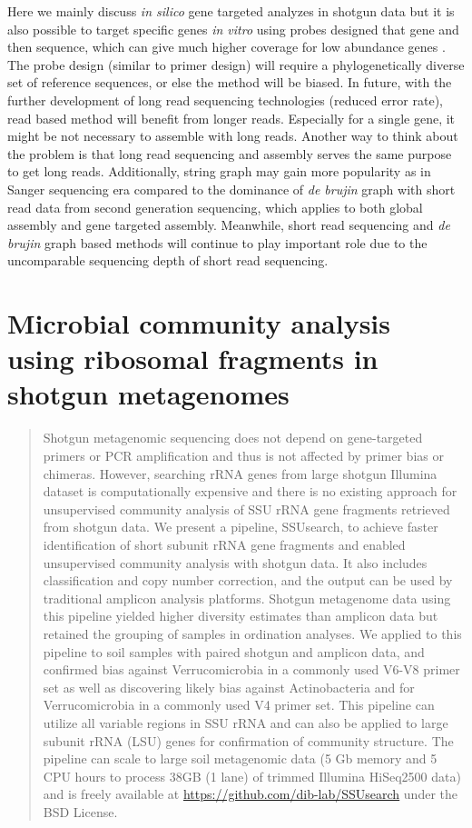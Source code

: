 \documentclass[]{msu-thesis}
\begin{document}
Here we mainly discuss \textit{in silico} gene targeted analyzes in
shotgun data but it is also possible to target specific genes
\textit{in vitro} using probes designed that gene and then sequence,
which can give much higher coverage for low abundance genes
\cite{mercer_targeted_2014}. The probe design (similar to primer
design) will require a phylogenetically diverse set of reference
sequences, or else the method will be biased. In future, with the
further development of long read sequencing technologies (reduced
error rate), read based method will benefit from longer
reads. Especially for a single gene, it might be not necessary to
assemble with long reads. Another way to think about the problem is
that long read sequencing and assembly serves the same purpose to get
long reads. Additionally, string graph may gain more popularity as in
Sanger sequencing era compared to the dominance of \textit{de brujin}
graph with short read data from second generation sequencing, which
applies to both global assembly and gene targeted assembly. Meanwhile,
short read sequencing and \textit{de brujin} graph based methods will
continue to play important role due to the uncomparable sequencing
depth of short read sequencing.





\chapter{Microbial community analysis using ribosomal fragments in shotgun metagenomes}

\begin{abstract}
Shotgun metagenomic sequencing does not depend on gene-targeted primers or PCR amplification and thus is not affected by primer bias or chimeras. However, searching rRNA genes from large shotgun Illumina dataset is computationally expensive and there is no existing approach for unsupervised community analysis of SSU rRNA gene fragments retrieved from shotgun data. We present a pipeline, SSUsearch, to achieve faster identification of short subunit rRNA gene fragments and enabled unsupervised community analysis with shotgun data. It also includes classification and copy number correction, and the output can be used by traditional amplicon analysis platforms. Shotgun metagenome data using this pipeline yielded higher diversity estimates than amplicon data but retained the grouping of samples in ordination analyses. We applied to this pipeline to soil samples with paired shotgun and amplicon data, and confirmed bias against Verrucomicrobia in a commonly used V6-V8 primer set as well as discovering likely bias against Actinobacteria and for Verrucomicrobia in a commonly used V4 primer set. This pipeline can utilize all variable regions in SSU rRNA and can also be applied to large subunit rRNA (LSU) genes for confirmation of community structure. The pipeline can scale to large soil metagenomic data (5 Gb memory and 5 CPU hours to process 38GB (1 lane) of trimmed Illumina HiSeq2500 data) and is freely available at \url{https://github.com/dib-lab/SSUsearch} under the BSD License.
\end{abstract}
\end{document}

